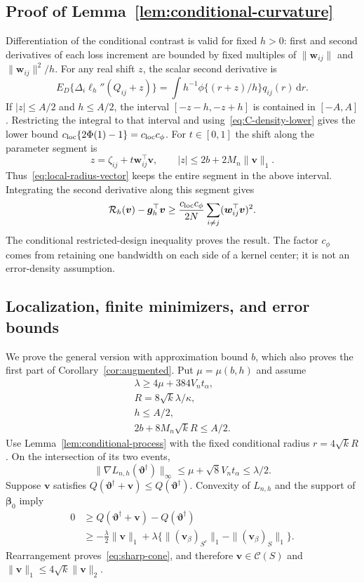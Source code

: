 \subsection{Proof of Lemma~\ref{lem:conditional-curvature}}
\label{subapp:curvature-proof}
Differentiation of the conditional contrast is valid for fixed $h>0$: first and second derivatives of each loss increment are bounded by fixed multiples of $\|\bm{w}_{ij}\|$ and $\|\bm{w}_{ij}\|^2/h$. For any real shift $z$, the scalar second derivative is
\begin{equation}
 E_D\{\Delta_i\ell_h''(Q_{ij}+z)\}
 =\int h^{-1}\phi\{(r+z)/h\}q_{ij}(r)\,\mathrm{d}r.
 \label{eq:C-smoothed-curvature}
\end{equation}
If $|z|\le A/2$ and $h\le A/2$, the interval $[-z-h,-z+h]$ is contained in $[-A,A]$. Restricting the integral to that interval and using~\eqref{eq:C-density-lower} gives the lower bound $c_{\rm loc}\{2\Phi(1)-1\}=c_{\rm loc}c_\phi$.
For $t\in[0,1]$ the shift along the parameter segment is
\[
 z=\zeta_{ij}+t \bm{w}_{ij}^\top \bm{v},
 \qquad |z|\le2b+2M_n\|\bm{v}\|_1.
\]
Thus~\eqref{eq:local-radius-vector} keeps the entire segment in the above interval. Integrating the second derivative along this segment gives
\[
 \mathcal R_h(\bm{v})-\bm{g}_h^\top \bm{v}
 \ge\frac{c_{\rm loc}c_\phi}{2N}\sum_{i\ne j}(\bm{w}_{ij}^\top \bm{v})^2.
\]
The conditional restricted-design inequality proves the result. The factor $c_\phi$ comes from retaining one bandwidth on each side of a kernel center; it is not an error-density assumption.

\subsection{Localization, finite minimizers, and error bounds}
\label{subapp:localization}
We prove the general version with approximation bound $b$, which also proves the first part of Corollary~\ref{cor:augmented}. Put $\mu=\mu(b,h)$ and assume
\[\begin{gathered}
 \lambda\ge4\mu+384V_nt_\alpha,\\
 R=8\sqrt{k}\lambda/\kappa,\\
 h\le A/2,\\ 2b+8M_n\sqrt{k}R\le A/2.
\end{gathered}\]
Use Lemma~\ref{lem:conditional-process} with the fixed conditional radius $r=4\sqrt{k}R$. On the intersection of its two events,
\[
 \|\nabla L_{n,h}(\bm{\vartheta}^\dagger)\|_\infty
 \le\mu+\sqrt8V_nt_\alpha\le\lambda/2.
\]
Suppose $\bm{v}$ satisfies $Q(\bm{\vartheta}^\dagger+\bm{v})\le Q(\bm{\vartheta}^\dagger)$. Convexity of $L_{n,h}$ and the support of $\bm{\beta}_0$ imply
\begin{align*}
 0&\ge Q(\bm{\vartheta}^\dagger+\bm{v})-Q(\bm{\vartheta}^\dagger)\\
  &\ge-\tfrac\lambda2\|\bm{v}\|_1
          +\lambda\{\|(\bm{v}_\beta)_{S^c}\|_1-\|(\bm{v}_\beta)_S\|_1\}.
\end{align*}
Rearrangement proves~\eqref{eq:sharp-cone}, and therefore $\bm{v}\in\mathcal C(S)$ and $\|\bm{v}\|_1\le4\sqrt{k}\|\bm{v}\|_2$.

